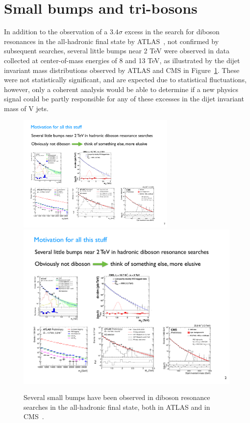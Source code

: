 \section{Small bumps and tri-bosons}
In addition to the observation of a $3.4 \sigma$ excess in the search for diboson resonances in the all-hadronic final state by ATLAS~\cite{Aad2015}, not confirmed by subsequent searches, several little bumps near 2 TeV were observed in data collected at center-of-mass energies of 8 and 13 TeV, as illustrated by the dijet invariant mass distributions observed by ATLAS and CMS in Figure~\ref{fig:searchIII:bumps}. These were not statistically significant, and are expected due to statistical fluctuations, however, only a coherent analysis would be able to determine if a new physics signal could be partly responsible for any of these excesses in the dijet invariant mass of V jets.
\begin{figure}[h!] 
    \centering
    \includegraphics[width=0.69\textwidth]{figures/analysis/search3/misc/bumps2.pdf}\\
    \includegraphics[width=0.99\textwidth]{figures/analysis/search3/misc/bumps1.pdf}\\
    \caption{Several small bumps have been observed in diboson resonance searches in the all-hadronic final state, both in ATLAS and in CMS~\cite{stealth}.}
    \label{fig:searchIII:bumps}
\end{figure}
